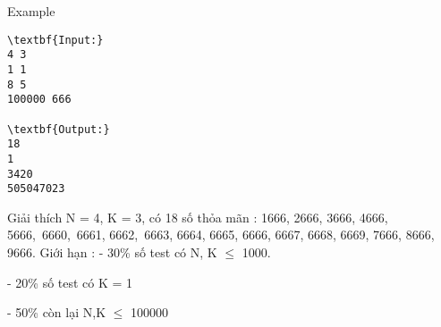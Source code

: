 Example
\begin{verbatim}
\textbf{Input:}
4 3
1 1
8 5
100000 666

\textbf{Output:}
18
1
3420
505047023
\end{verbatim}
Giải thích
N = 4, K = 3, có 18 số thỏa mãn : 1666, 2666, 3666, 4666, 5666, 6660, 6661, 6662, 6663, 6664, 6665, 6666, 6667, 6668, 6669, 7666, 8666, 9666.
Giới hạn :
- 30\% số test có N, K  $\le$  1000.

- 20\% số test có K = 1

- 50\% còn lại N,K  $\le$  100000